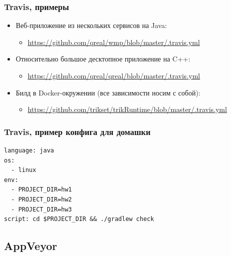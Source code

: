 \documentclass[xetex,mathserif,serif]{beamer}
\begin{document}
	\begin{frame}
		\frametitle{Travis, примеры}
		\begin{itemize}
			\item Веб-приложение из нескольких сервисов на Java:
			\begin{itemize}
				\item \url{https://github.com/qreal/wmp/blob/master/.travis.yml}
			\end{itemize}
			\item Относительно большое десктопное приложение на C++:
			\begin{itemize}
				\item \url{https://github.com/qreal/qreal/blob/master/.travis.yml}
			\end{itemize}
			\item Билд в Docker-окружении (все зависимости носим с собой):
			\begin{itemize}
				\item \url{https://github.com/trikset/trikRuntime/blob/master/.travis.yml}
			\end{itemize}
		\end{itemize}
	\end{frame}

	\begin{frame}[fragile]
		\frametitle{Travis, пример конфига для домашки}
		\begin{verbatim}
language: java
os:
  - linux
env:
  - PROJECT_DIR=hw1
  - PROJECT_DIR=hw2
  - PROJECT_DIR=hw3
script: cd $PROJECT_DIR && ./gradlew check
		\end{verbatim}
	\end{frame}

	\subsection{AppVeyor}
\end{document}
